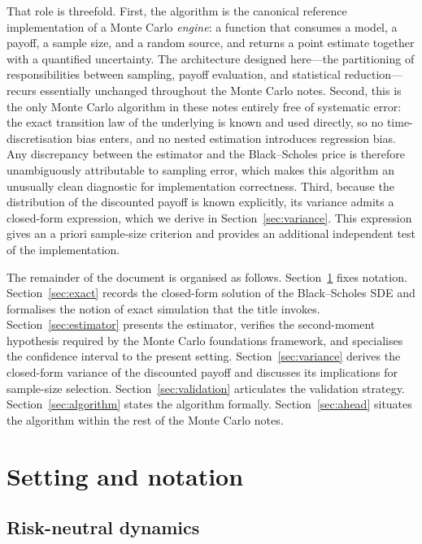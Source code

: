 \documentclass[11pt,a4paper]{article}
\theoremstyle{plain}
\theoremstyle{definition}
\theoremstyle{remark}
\begin{document}
That role is threefold. First, the algorithm is the canonical reference
implementation of a Monte Carlo \emph{engine}: a function that consumes
a model, a payoff, a sample size, and a random source, and returns a
point estimate together with a quantified uncertainty. The architecture
designed here---the partitioning of responsibilities between sampling,
payoff evaluation, and statistical reduction---recurs essentially
unchanged throughout the Monte Carlo notes. Second, this is the only
Monte Carlo
algorithm in these notes entirely free of systematic error: the exact
transition law
of the underlying is known and used directly, so no time-discretisation
bias enters, and no nested estimation introduces regression bias. Any
discrepancy between the estimator and the Black--Scholes price is
therefore unambiguously attributable to sampling error, which makes
this algorithm an unusually clean diagnostic for implementation
correctness. Third, because the distribution of the discounted payoff
is known explicitly, its variance admits a closed-form expression,
which we derive in Section~\ref{sec:variance}. This expression gives
an a priori sample-size criterion and provides an additional
independent test of the implementation.

The remainder of the document is organised as follows.
Section~\ref{sec:setting} fixes notation. Section~\ref{sec:exact}
records the closed-form solution of the Black--Scholes SDE and
formalises the notion of exact simulation that the title invokes.
Section~\ref{sec:estimator} presents the estimator, verifies the
second-moment hypothesis required by the Monte Carlo foundations
framework, and specialises the confidence interval to the present setting.
Section~\ref{sec:variance} derives the closed-form variance of the
discounted payoff and discusses its implications for sample-size
selection. Section~\ref{sec:validation} articulates the validation
strategy. Section~\ref{sec:algorithm} states the algorithm formally.
Section~\ref{sec:ahead} situates the algorithm within the rest of
the Monte Carlo notes.

\section{Setting and notation}
\label{sec:setting}

\subsection{Risk-neutral dynamics}
\end{document}
